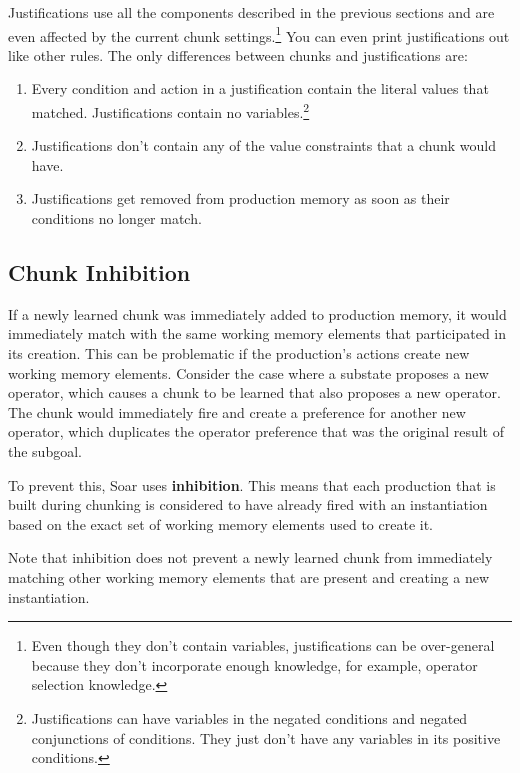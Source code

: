Justifications use all the components described in the previous sections and are even affected by the current chunk settings.\footnote{
	Even though they don't contain variables, justifications can be over-general because they don't incorporate enough knowledge, for example, operator selection knowledge.}
 You can even print justifications out like other rules.  The only differences between chunks and justifications are:

 \begin{enumerate}
	\item Every condition and action in a justification contain the literal values that matched.  Justifications contain no variables.\footnote{
		Justifications can have variables in the negated conditions and negated conjunctions of conditions.  They just don't have any variables in its positive conditions.}
	\item Justifications don't contain any of the value constraints that a chunk would have.
	\item Justifications get removed from production memory as soon as their conditions no longer match.
 \end{enumerate}

\subsection{Chunk Inhibition}
\label{CHUNKING-subtleties-inhibition}

If a newly learned chunk was immediately added to production memory, it would immediately match with the same working memory elements that participated in its creation.  This can be problematic if the production's actions create new working memory elements.  Consider the case where a substate proposes a new operator, which causes a chunk to be learned that also proposes a new operator. The chunk would immediately fire and create a preference for another new operator, which duplicates the operator preference that was the original result of the subgoal.

To prevent this, Soar uses \textbf{inhibition}. This means that each production that is built during chunking is considered to have already fired with an instantiation based on the exact set of working memory elements used to create it.

Note that inhibition does not prevent a newly learned chunk from immediately matching other working memory elements that are present and creating a new instantiation.

